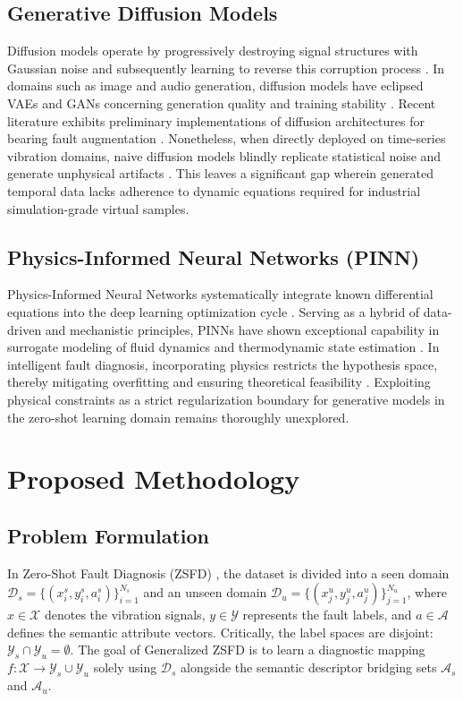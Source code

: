 \documentclass[journal]{IEEEtran}
\begin{document}
\subsection{Generative Diffusion Models}
Diffusion models operate by progressively destroying signal structures with Gaussian noise and subsequently learning to reverse this corruption process \cite{ho2020denoising}. In domains such as image and audio generation, diffusion models have eclipsed VAEs and GANs concerning generation quality and training stability \cite{song2020score,goodfellow2014generative}. Recent literature exhibits preliminary implementations of diffusion architectures for bearing fault augmentation \cite{ho2020denoising}. Nonetheless, when directly deployed on time-series vibration domains, naive diffusion models blindly replicate statistical noise and generate unphysical artifacts \cite{song2020score}. This leaves a significant gap wherein generated temporal data lacks adherence to dynamic equations required for industrial simulation-grade virtual samples.

\subsection{Physics-Informed Neural Networks (PINN)}
Physics-Informed Neural Networks systematically integrate known differential equations into the deep learning optimization cycle \cite{raissi2019physics}. Serving as a hybrid of data-driven and mechanistic principles, PINNs have shown exceptional capability in surrogate modeling of fluid dynamics and thermodynamic state estimation \cite{chen2021physics}. In intelligent fault diagnosis, incorporating physics restricts the hypothesis space, thereby mitigating overfitting and ensuring theoretical feasibility \cite{yucesan2022hybrid}. Exploiting physical constraints as a strict regularization boundary for generative models in the zero-shot learning domain remains thoroughly unexplored.
\section{Proposed Methodology}
\label{sec:method}

\subsection{Problem Formulation}
In Zero-Shot Fault Diagnosis (ZSFD) \cite{zhang2023zero}, the dataset is divided into a seen domain $\mathcal{D}_s = \{(x_i^s, y_i^s, a_i^s)\}_{i=1}^{N_s}$ and an unseen domain $\mathcal{D}_u = \{(x_j^u, y_j^u, a_j^u)\}_{j=1}^{N_u}$, where $x \in \mathcal{X}$ denotes the vibration signals, $y \in \mathcal{Y}$ represents the fault labels, and $a \in \mathcal{A}$ defines the semantic attribute vectors. Critically, the label spaces are disjoint: $\mathcal{Y}_s \cap \mathcal{Y}_u = \emptyset$. The goal of Generalized ZSFD is to learn a diagnostic mapping $f: \mathcal{X} \rightarrow \mathcal{Y}_s \cup \mathcal{Y}_u$ solely using $\mathcal{D}_s$ alongside the semantic descriptor bridging sets $\mathcal{A}_s$ and $\mathcal{A}_u$.
\end{document}
